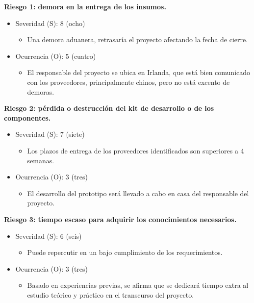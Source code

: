 \documentclass[
11pt, %
]{charter}
\begin{document}
\textbf{Riesgo 1: demora en la entrega de los insumos.}
\begin{itemize}
	\item Severidad (S): 8 (ocho)
		\begin{itemize}
			\item Una demora aduanera, retrasaría el proyecto afectando la fecha de cierre.
		\end{itemize}
	\item Ocurrencia (O): 5 (cuatro)
		\begin{itemize}
			\item El responsable del proyecto se ubica en Irlanda, que está bien comunicado con los proveedores, principalmente chinos, pero no está excento de demoras.
		\end{itemize}
\end{itemize}   

\textbf{Riesgo 2: pérdida o destrucción del kit de desarrollo o de los componentes.}
\begin{itemize}
	\item Severidad (S): 7 (siete)
		\begin{itemize}
			\item Los plazos de entrega de los proveedores identificados son superiores a 4 semanas.
		\end{itemize}
	\item Ocurrencia (O): 3 (tres)
		\begin{itemize}
			\item El desarrollo del prototipo será llevado a cabo en casa del responsable del proyecto.
		\end{itemize}
\end{itemize}

\textbf{Riesgo 3: tiempo escaso para adquirir los conocimientos necesarios.}
\begin{itemize}
	\item Severidad (S): 6 (seis)
		\begin{itemize}
			\item Puede repercutir en un bajo cumplimiento de los requerimientos.
		\end{itemize}
	\item Ocurrencia (O): 3 (tres)
		\begin{itemize}
			\item Basado en experiencias previas, se afirma que se dedicará tiempo extra al estudio teórico y práctico en el transcurso del proyecto.
		\end{itemize}
\end{itemize}
\end{document}

